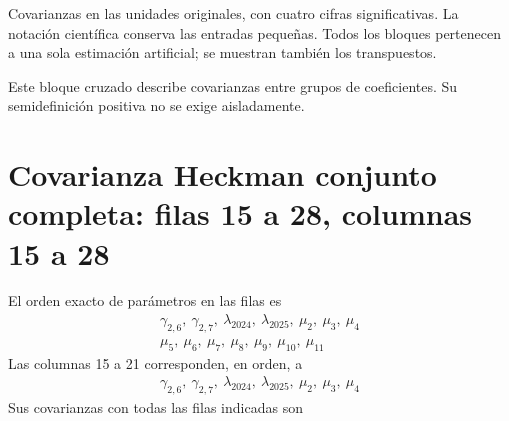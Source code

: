 \documentclass[11pt,a4paper]{article}
\begin{document}
Covarianzas en las unidades originales, con cuatro cifras significativas. La notación científica conserva las entradas pequeñas. Todos los bloques pertenecen a una sola estimación artificial; se muestran también los transpuestos.

Este bloque cruzado describe covarianzas entre grupos de coeficientes. Su semidefinición positiva no se exige aisladamente.

\clearpage
\section{Covarianza Heckman conjunto completa: filas 15 a 28, columnas 15 a 28}
El orden exacto de parámetros en las filas es
\[
\begin{gathered}\gamma_{2,6},\ \gamma_{2,7},\ \lambda_{2024},\ \lambda_{2025},\ \mu_2,\ \mu_3,\ \mu_4\\\mu_5,\ \mu_6,\ \mu_7,\ \mu_8,\ \mu_9,\ \mu_10,\ \mu_11\end{gathered}
\]
Las columnas 15 a 21 corresponden, en orden, a
\[
\begin{gathered}\gamma_{2,6},\ \gamma_{2,7},\ \lambda_{2024},\ \lambda_{2025},\ \mu_2,\ \mu_3,\ \mu_4\end{gathered}
\]
Sus covarianzas con todas las filas indicadas son
\end{document}
